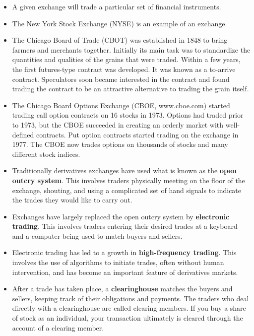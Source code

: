 \documentclass[letterpaper,10pt]{article}
\begin{document}
\begin{itemize}

\item A given exchange will trade a particular set of financial instruments.

\item The New York Stock Exchange (NYSE) is an example of an exchange.

\item The Chicago Board of Trade (CBOT) was established in 1848 to bring farmers and merchants together. Initially its main task was to standardize the quantities and qualities of the grains that were traded. Within a few years, the first futures-type contract was developed. It was known as a to-arrive contract. Speculators soon became interested in the contract and found trading the contract to be an attractive alternative to trading the grain itself.

\item The Chicago Board Options Exchange (CBOE, www.cboe.com) started trading call option contracts on 16 stocks in 1973. Options had traded prior to 1973, but the CBOE succeeded in creating an orderly market with well-defined contracts. Put option contracts started trading on the exchange in 1977. The CBOE now trades options on thousands of stocks and many different stock indices.

\item Traditionally derivatives exchanges have used what is known as the {\bf open outcry system}. This involves traders physically meeting on the floor of the exchange, shouting, and using a complicated set of hand signals to indicate the trades they would like to carry out. 

\item Exchanges have largely replaced the open outcry system by {\bf electronic trading}. This involves traders entering their desired trades at a keyboard and a computer being used to match buyers and sellers. 

\item Electronic trading has led to a growth in {\bf high-frequency trading}. This involves the use of algorithms to initiate trades, often without human intervention, and has become an important feature of derivatives markets.


\item After a trade has taken place, a {\bf clearinghouse} matches the buyers and sellers, keeping track of their obligations and payments. The traders who deal directly with a clearinghouse are called clearing members. If you buy a share of stock as an individual, your transaction ultimately is cleared through the account of a clearing member.


\end{itemize}
\end{document}
